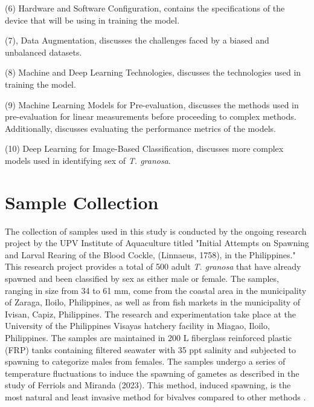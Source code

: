 (6) Hardware and Software Configuration, contains the specifications of the device that will be using in training the model. 

(7), Data Augmentation, discusses the challenges faced by a biased and unbalanced datasets. 

(8) Machine and Deep Learning Technologies, discusses the technologies used in training the model. 

(9) Machine Learning Models for Pre-evaluation, discusses the methods used in pre-evaluation for linear measurements before proceeding to complex methods. Additionally, discusses evaluating the performance metrics of the models. 

(10) Deep Learning for Image-Based Classification, discusses more complex models used in identifying sex of \textit{T. granosa}. 


\section{Sample Collection}
\label{sec:samplecollect}
The collection of \Tgranosa samples used in this study is conducted by the ongoing research project by the UPV Institute of Aquaculture titled "Initial Attempts on Spawning and Larval Rearing of the Blood Cockle, \Tegillarcagranosa (Linnaeus, 1758), in the Philippines." This research project provides a total of 500 adult \textit{T. granosa} that have already spawned and been classified by sex as either male or female. The samples, ranging in size from 34 to 61 mm, come from the coastal area in the municipality of Zaraga, Iloilo, Philippines, as well as from fish markets in the municipality of Ivisan, Capiz, Philippines. The research and experimentation take place at the University of the Philippines Visayas hatchery facility in Miagao, Iloilo, Philippines. The samples are maintained in 200 L fiberglass reinforced plastic (FRP) tanks containing filtered seawater with 35 ppt salinity \cite{miranda2023} and subjected to spawning to categorize males from females. The samples undergo a series of temperature fluctuations to induce the spawning of gametes as described in the study of Ferriols and Miranda (2023). This method, induced spawning, is the most natural and least invasive method for bivalves compared to other methods \cite{aji}.

